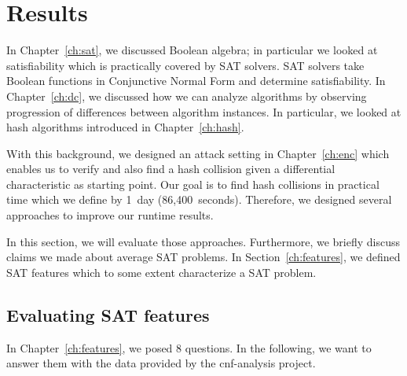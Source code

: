 \renewcommand*\chappic{img/megosat-bw.pdf}
\renewcommand*\chapquote{}
\renewcommand*\chapquotesrc{}
\chapter{Results}
\label{ch:results}
%
In Chapter~\ref{ch:sat}, we discussed Boolean algebra; in particular we looked at
satisfiability which is practically covered by SAT solvers. SAT solvers take
Boolean functions in Conjunctive Normal Form and determine satisfiability.
In Chapter~\ref{ch:dc}, we discussed how we can analyze algorithms by observing
progression of differences between algorithm instances. In particular,
we looked at hash algorithms introduced in Chapter~\ref{ch:hash}.

With this background, we designed an attack setting in Chapter~\ref{ch:enc}
which enables us to verify and also find a hash collision given a differential
characteristic as starting point. Our goal is to find hash collisions
in practical time which we define by 1~day (86,400~seconds).
Therefore, we designed several approaches to improve our runtime results.

In this section, we will evaluate those approaches. Furthermore, we briefly
discuss claims we made about average SAT problems. In Section~\ref{ch:features},
we defined SAT features which to some extent characterize a SAT problem.

\section{Evaluating SAT features}
\label{sec:results-features}
%
In Chapter~\ref{ch:features}, we posed 8 questions.
In the following, we want to answer them with the data
provided by the cnf-analysis project.

